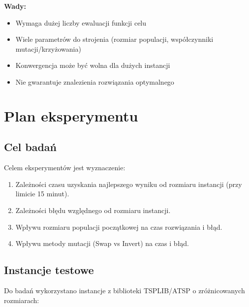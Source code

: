 \documentclass[a4paper,12pt]{article}
\begin{document}
\textbf{Wady:}
\begin{itemize}
    \item Wymaga dużej liczby ewaluacji funkcji celu
    \item Wiele parametrów do strojenia (rozmiar populacji, współczynniki mutacji/krzyżowania)
    \item Konwergencja może być wolna dla dużych instancji
    \item Nie gwarantuje znalezienia rozwiązania optymalnego
\end{itemize}

\section{Plan eksperymentu}

\subsection{Cel badań}

Celem eksperymentów jest wyznaczenie:
\begin{enumerate}
    \item Zależności czasu uzyskania najlepszego wyniku od rozmiaru instancji (przy limicie 15 minut).
    \item Zależności błędu względnego od rozmiaru instancji.
    \item Wpływu rozmiaru populacji początkowej na czas rozwiązania i błąd.
    \item Wpływu metody mutacji (Swap vs Invert) na czas i błąd.
\end{enumerate}

\subsection{Instancje testowe}

Do badań wykorzystano instancje z biblioteki TSPLIB/ATSP o zróżnicowanych rozmiarach:
\end{document}
